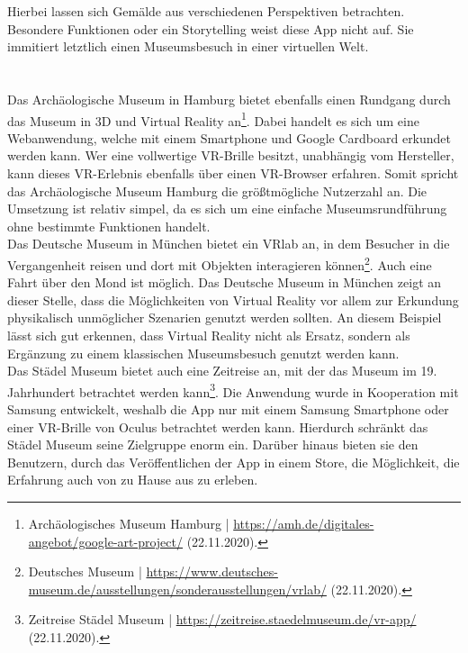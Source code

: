 \documentclass[a4paper,12pt,oneside]{article}
\begin{document}
        Hierbei lassen sich Gemälde aus verschiedenen Perspektiven betrachten.
        Besondere Funktionen oder ein Storytelling weist diese App nicht auf. Sie immitiert
        letztlich einen Museumsbesuch in einer virtuellen Welt. \\ \\ \\
        Das Archäologische Museum in Hamburg bietet ebenfalls einen Rundgang durch
        das Museum in 3D und Virtual Reality an\footnote{Archäologisches Museum Hamburg | \url{https://amh.de/digitales-angebot/google-art-project/} (22.11.2020).}.
        Dabei handelt es sich um eine Webanwendung, welche mit einem Smartphone und
        Google Cardboard erkundet werden kann. Wer eine vollwertige VR-Brille besitzt,
        unabhängig vom Hersteller, kann dieses VR-Erlebnis ebenfalls über einen VR-Browser
        erfahren. Somit spricht das Archäologische Museum Hamburg die größtmögliche 
        Nutzerzahl an.
        Die Umsetzung ist relativ simpel, da es sich um eine einfache Museumsrundführung
        ohne bestimmte Funktionen handelt. \\
        Das Deutsche Museum in München bietet ein VRlab an, in dem Besucher in die Vergangenheit
        reisen und dort mit Objekten interagieren können\footnote{Deutsches Museum | \url{https://www.deutsches-museum.de/ausstellungen/sonderausstellungen/vrlab/} (22.11.2020).}.
        Auch eine Fahrt über den Mond ist möglich. Das Deutsche Museum in München 
        zeigt an dieser Stelle,
        dass die Möglichkeiten von Virtual Reality vor allem zur Erkundung physikalisch unmöglicher
        Szenarien genutzt werden sollten. An 
        diesem Beispiel lässt sich gut erkennen, dass Virtual Reality nicht als Ersatz, sondern
        als Ergänzung zu einem klassischen Museumsbesuch genutzt werden kann. \\
        Das Städel Museum bietet auch eine Zeitreise an, mit der das Museum im 19. Jahrhundert
        betrachtet werden kann\footnote{Zeitreise Städel Museum | \url{https://zeitreise.staedelmuseum.de/vr-app/} (22.11.2020).}.
        Die Anwendung wurde in Kooperation mit Samsung entwickelt, weshalb die App
        nur mit einem Samsung Smartphone oder einer VR-Brille von Oculus betrachtet werden
        kann. Hierdurch schränkt das Städel Museum seine Zielgruppe enorm ein. 
        Darüber hinaus bieten sie den Benutzern, durch das Veröffentlichen der App
        in einem Store, die Möglichkeit, die Erfahrung auch von zu Hause aus zu erleben. \\
\end{document}
